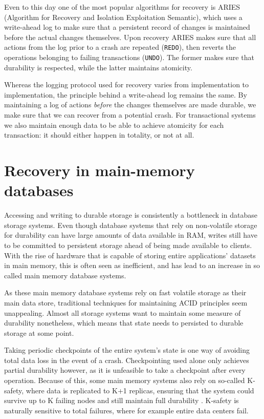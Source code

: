 \documentclass[b5paper]{report}
\begin{document}
Even to this day one of the most popular algorithms for recovery is ARIES
\cite{aries} (Algorithm for Recovery and Isolation Exploitation Semantic), which
uses a write-ahead log to make sure that a persistent record of changes is
maintained before the actual changes themselves. Upon recovery ARIES makes sure
that all actions from the log prior to a crash are repeated (\texttt{REDO}),
then reverts the operations belonging to failing transactions (\texttt{UNDO}).
The former makes sure that durability is respected, while the latter maintains
atomicity.

Whereas the logging protocol used for recovery varies from implementation to
implementation, the principle behind a write-ahead log remains the same. By
maintaining a log of actions \textit{before} the changes themselves are made
durable, we make sure that we can recover from a potential crash. For
transactional systems we also maintain enough data to be able to achieve
atomicity for each transaction: it should either happen in totality, or not at
all.

\section{Recovery in main-memory databases} \label{main-memory-recovery}
Accessing and writing to durable storage is consistently a bottleneck in
database storage systems. Even though database systems that rely on non-volatile
storage for durability can have large amounts of data available in RAM, writes
still have to be committed to persistent storage ahead of being made available
to clients. With the rise of hardware that is capable of storing entire
applications' datasets in main memory, this is often seen as inefficient,
and has lead to an increase in so called main memory database systems.

As these main memory database systems rely on fast volatile storage as their
main data store, traditional techniques for maintaining ACID principles seem
unappealing. Almost all storage systems want to maintain some measure of
durability nonetheless, which means that state needs to persisted to
durable storage at some point.

Taking periodic checkpoints of the entire system's state is one way of avoiding
total data loss in the event of a crash. Checkpointing used alone only achieves
partial durability however, as it is unfeasible to take a checkpoint after every
operation. Because of this, some main memory systems also rely on so-called
K-safety, where data is replicated to K+1 replicas, ensuring that the system
could survive up to K failing nodes and still maintain full durability
\cite{early-voltdb}. K-safety is naturally sensitive to total failures, where
for example entire data centers fail.
\end{document}
